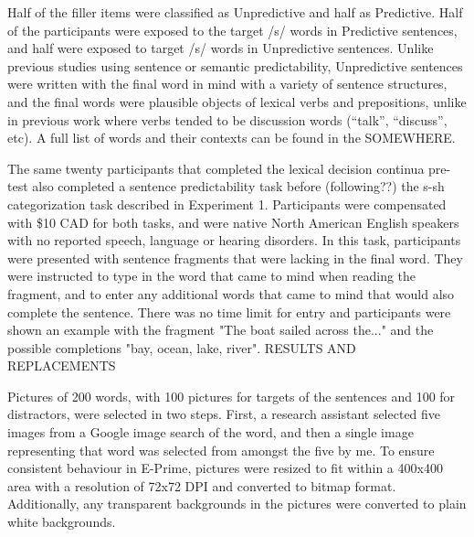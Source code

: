 Half of the filler items were classified as Unpredictive and half as Predictive.  Half of the participants were exposed to the target /s/ words in Predictive sentences, and half were exposed to target /s/ words in Unpredictive sentences.   Unlike previous studies using sentence or semantic predictability, Unpredictive sentences were written with the final word in mind with a variety of sentence structures, and the final words were plausible objects of lexical verbs and prepositions, unlike in previous work where verbs tended to be discussion words (``talk'', ``discuss'', etc).  A full list of words and their contexts can be found in the SOMEWHERE.

The same twenty participants that completed the lexical decision continua pre-test also completed a sentence predictability task before (following??) the s-sh categorization task described in Experiment 1. Participants were compensated with \$10 CAD for both tasks, and were native North American English speakers with no reported speech, language or hearing disorders. In this task, participants were presented with sentence fragments that were lacking in the final word.  They were instructed to type in the word that came to mind when reading the fragment, and to enter any additional words that came to mind that would also complete the sentence.  There was no time limit for entry and participants were shown an example with the fragment "The boat sailed across the..." and the possible completions "bay, ocean, lake, river".  RESULTS AND REPLACEMENTS

Pictures of 200 words, with 100 pictures for targets of the sentences and 100 for distractors, were selected in two steps.  First, a research assistant selected five images from a Google image search of the word, and then a single image representing that word was selected from amongst the five by me.  To ensure consistent behaviour in E-Prime, pictures were resized to fit within a 400x400 area with a resolution of 72x72 DPI and converted to bitmap format.  Additionally, any transparent backgrounds in the pictures were converted to plain white backgrounds.

